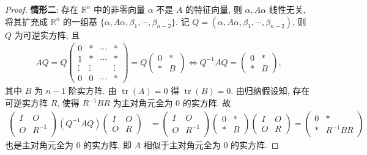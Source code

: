 \documentclass[../../main.tex]{subfiles}%
\begin{document}
\begin{proof}
\textbf{情形二}: 存在 $\mathbb{R}^n$ 中的非零向量 $\alpha$ 不是 $A$ 的特征向量, 则 $\alpha,A\alpha$ 线性无关, 将其扩充成 $\mathbb{R}^n$ 的一组基 $\{\alpha,A\alpha,\beta_1,\cdots,\beta_{n-2}\}$. 记 $Q=(\alpha,A\alpha,\beta_1,\cdots,\beta_{n-2})$, 则 $Q$ 为可逆实方阵, 且
\begin{align*}
AQ = Q\begin{pmatrix}
0 & * & \cdots & * \\
1 & * & \cdots & * \\
\vdots & \vdots & & \vdots \\
0 & 0 & \cdots & *
\end{pmatrix}
= Q\begin{pmatrix}
0 & * \\
* & B
\end{pmatrix}
\Longleftrightarrow Q^{-1}AQ = \begin{pmatrix}
0 & * \\
* & B
\end{pmatrix},
\end{align*}
其中 $B$ 为 $n-1$ 阶实方阵. 由 $\operatorname{tr}(A)=0$ 得 $\operatorname{tr}(B)=0$. 由归纳假设知, 存在可逆实方阵 $R$, 使得 $R^{-1}BR$ 为主对角元全为 $0$ 的实方阵. 故
\begin{align*}
\begin{pmatrix}
I & O \\
O & R^{-1}
\end{pmatrix}
(Q^{-1}AQ)
\begin{pmatrix}
I & O \\
O & R
\end{pmatrix}
&=
\begin{pmatrix}
I & O \\
O & R^{-1}
\end{pmatrix}
\begin{pmatrix}
0 & * \\
* & B
\end{pmatrix}
\begin{pmatrix}
I & O \\
O & R
\end{pmatrix}
=
\begin{pmatrix}
0 & * \\
* & R^{-1}BR
\end{pmatrix}
\end{align*}
也是主对角元全为 $0$ 的实方阵, 即 $A$ 相似于主对角元全为 $0$ 的实方阵.

\end{proof}
\end{document}
